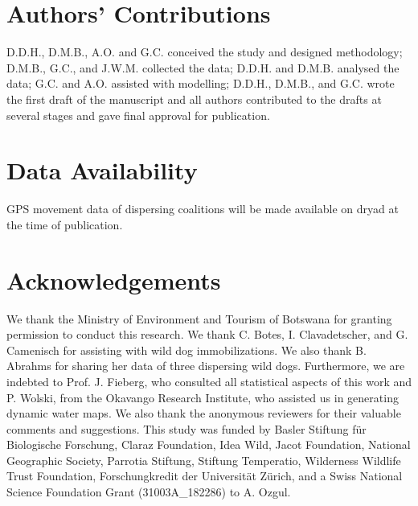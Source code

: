 \documentclass[abstract=on,10pt,a4paper,bibliography=totocnumbered]{article}
\begin{document}
\section{Authors' Contributions}
D.D.H., D.M.B., A.O. and G.C. conceived the study and designed methodology;
D.M.B., G.C., and J.W.M. collected the data; D.D.H. and D.M.B. analysed the
data; G.C. and A.O. assisted with modelling; D.D.H., D.M.B., and G.C. wrote the
first draft of the manuscript and all authors contributed to the drafts at
several stages and gave final approval for publication.

\section{Data Availability}
GPS movement data of dispersing coalitions will be made available on dryad at
the time of publication.

\section{Acknowledgements}
We thank the Ministry of Environment and Tourism of Botswana for granting
permission to conduct this research. We thank C. Botes, I. Clavadetscher, and G.
Camenisch for assisting with wild dog immobilizations. We also thank B. Abrahms
for sharing her data of three dispersing wild dogs. Furthermore, we are indebted
to Prof. J. Fieberg, who consulted all statistical aspects of this work and P.
Wolski, from the Okavango Research Institute, who assisted us in generating
dynamic water maps. We also thank the anonymous reviewers for their valuable
comments and suggestions. This study was funded by Basler Stiftung für
Biologische Forschung, Claraz Foundation, Idea Wild, Jacot Foundation, National
Geographic Society, Parrotia Stiftung, Stiftung Temperatio, Wilderness Wildlife
Trust Foundation, Forschungkredit der Universität Zürich, and a Swiss National
Science Foundation Grant (31003A\_182286) to A. Ozgul.

\newpage
\begingroup
\singlespacing

\endgroup
\end{document}
